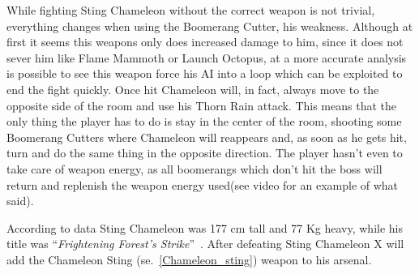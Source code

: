 While fighting Sting Chameleon without the correct weapon is not trivial, everything changes when using the Boomerang Cutter, his weakness. Although at first it seems this weapons only does increased damage to him, since it does not sever him like Flame Mammoth or Launch Octopus, at a more accurate analysis is possible to see this weapon force his AI into a loop which can be exploited to end the fight quickly. Once hit Chameleon will, in fact, always move to the opposite side of the room and use his Thorn Rain attack. This means that the only thing the player has to do is stay in the center of the room, shooting some Boomerang Cutters where Chameleon will reappears and, as soon as he gets hit, turn and do the same thing in the opposite direction. The player hasn't even to take care of weapon energy, as all boomerangs which don't hit the boss will return and replenish the weapon energy used(see video  for an example of what said).  

According to data Sting Chameleon was 177 cm tall and 77 Kg heavy, while his title was ``\textit{Frightening Forest's Strike}''~\cite{book:MMX_Complete_art}.
After defeating Sting Chameleon X will add the Chameleon Sting (se.~\ref{Chameleon_sting}) weapon to his arsenal.

